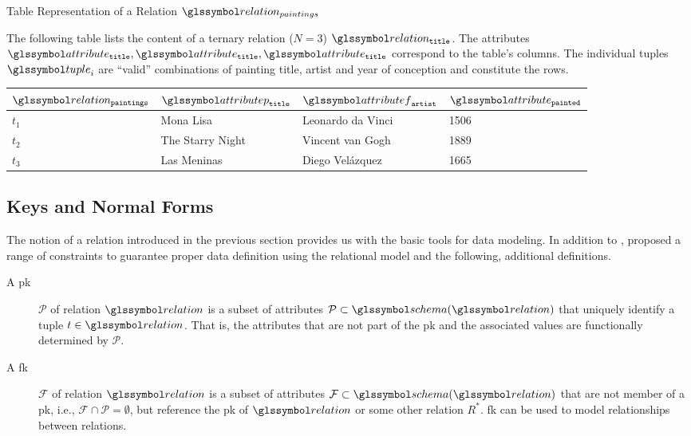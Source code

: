 \begin{example}[label=example:relational_table]{Table Representation of a Relation $\relation_{paintings}$}{}
    
    The following table lists the content of a ternary relation ($N = 3$) $\relation_{\mathtt{title}}$. The attributes $\attribute_{\mathtt{title}}, \attribute_{\mathtt{title}}, \attribute_{\mathtt{title}}$ correspond to the table's columns. The individual tuples $\tuple_i$ are ``valid'' combinations of painting title, artist and year of conception and constitute the rows.
        
    \begin{center}
        \begin{tabular}{ l || l | l | l |}
            $\relation_{\mathtt{paintings}}$ & $\attributep_{\mathtt{title}}$  & $\attributef_{\mathtt{artist}}$  & $\attribute_{\mathtt{painted}}$ \\ 
            \hline
            \hline
            $t_1$ & Mona Lisa &  Leonardo da Vinci & 1506 \\
            \hline
            $t_2$ & The Starry Night & Vincent van Gogh & 1889 \\
            \hline
            $t_3$ & Las Meninas & Diego Velázquez & 1665 \\
            \hline
        \end{tabular}
    \end{center}
\end{example}


\subsection{Keys and Normal Forms}

The notion of a relation introduced in the previous section provides us with the basic tools for data modeling. In addition to , \cite{Codd:1970Relational} proposed a range of constraints to guarantee proper data definition using the relational model and the following, additional definitions. 

\begin{description}
    \item[A \acrfull{pk}] $\mathcal{P}$ of relation $\relation$ is a subset of attributes $\mathcal{P} \subset \schema(\relation)$ that uniquely identify a tuple $t \in \relation$. That is, the attributes that are not part of the \acrshort{pk} and the associated values are functionally determined by $\mathcal{P}$.
    \item[A \acrfull{fk}] $\mathcal{F}$ of relation $\relation$ is a subset of attributes $\mathcal{F} \subset \schema(\relation)$ that are not member of a \acrshort{pk}, i.e., $ \mathcal{F} \cap \mathcal{P} = \emptyset$, but reference the \acrshort{pk} of $\relation$ or some other relation $R^{*}$. \acrshort{fk} can be used to model relationships between relations.
\end{description}

